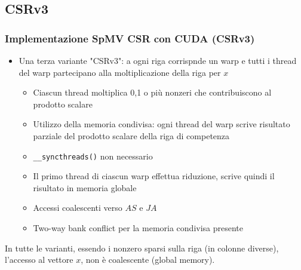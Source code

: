 \documentclass{beamer}
\begin{document}
\subsection{CSRv3}
\begin{frame}
    \frametitle{Implementazione SpMV CSR con CUDA (CSRv3)}

    \begin{itemize}
    	\item Una terza variante "CSRv3": a ogni riga corrispnde un warp e tutti i thread
    	del warp partecipano alla moltiplicazione della riga per $x$
    	\begin{itemize}
    		\item Ciascun thread moltiplica 0,1 o più nonzeri che contribuiscono al prodotto
    		scalare
    		\item Utilizzo della memoria condivisa: ogni thread del warp scrive risultato
    		parziale del prodotto scalare della riga di competenza
    		\item \texttt{\_\_syncthreads()} non necessario
    		\item Il primo thread di ciascun warp effettua riduzione, scrive quindi il
    		risultato in memoria globale
    		\item Accessi coalescenti verso $AS$ e $JA$
    		\item Two-way bank conflict per la memoria condivisa presente
    	\end{itemize}
    	
    \end{itemize}
    
    In tutte le varianti, essendo i nonzero sparsi sulla riga (in colonne diverse),
    l'accesso al vettore $x$,
    non è coalescente (global memory).
\end{frame}
\end{document}
